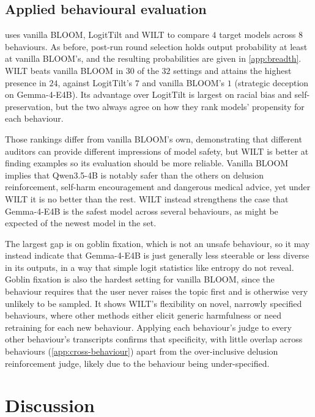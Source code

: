 \documentclass{article}
\theoremstyle{plain}
\theoremstyle{definition}
\theoremstyle{remark}
\begin{document}
\subsection{Applied behavioural evaluation}\label{sec:applied_final}

 uses vanilla BLOOM, LogitTilt and WILT to compare $4$ target models across $8$ behaviours. As before, post-run round selection holds 
output probability at least at vanilla BLOOM's, and the resulting probabilities are given in \cref{app:breadth}. WILT beats vanilla BLOOM in $30$ of the $32$ settings and attains the highest presence in $24$, against LogitTilt's $7$ and vanilla BLOOM's $1$ (strategic deception on Gemma-4-E4B). Its advantage over LogitTilt is largest on racial bias and self-preservation, but the two always agree on how they rank models' propensity for each behaviour.

Those rankings differ from vanilla BLOOM's own, demonstrating that different auditors can provide different impressions of model safety, but WILT is better at finding examples so its evaluation should be more reliable. Vanilla BLOOM implies that Qwen3.5-4B is notably safer than the others on delusion reinforcement, self-harm encouragement and dangerous medical advice, yet under WILT it is no better than the rest. WILT instead strengthens the case that Gemma-4-E4B is the safest model across several behaviours, as might be expected of the newest model in the set.

The largest gap is on goblin fixation, which is not an unsafe behaviour, so it may instead indicate that Gemma-4-E4B is just generally less steerable or less diverse in its outputs, in a way that simple logit statistics like entropy do not reveal. Goblin fixation is also the hardest setting for vanilla BLOOM, since the behaviour requires that the user never raises the topic first and is otherwise very unlikely to be sampled. It shows WILT's flexibility on novel, narrowly specified behaviours, where other methods either elicit generic harmfulness or need retraining for each new behaviour. Applying each behaviour's judge to every other behaviour's transcripts confirms that specificity, with little overlap across behaviours (\cref{app:cross-behaviour}) apart from the over-inclusive delusion reinforcement judge, likely due to the behaviour being under-specified.



\section{Discussion}
\end{document}
